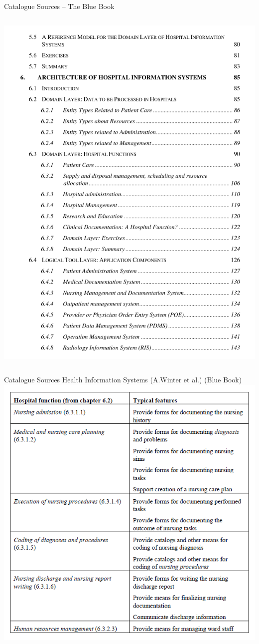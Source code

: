 \documentclass[aspectratio=1610,12pt]{beamer}
\newcommand{\enquote}[1]{{\glqq#1\grqq{}}}
\begin{document}
\begin{frame}{Catalogue Sources -- The \enquote{Blue Book}}
\begin{columns}
  \includegraphics[width=.9\textwidth,height=.8\textheight]{img/bb-content.png}
\end{columns}
\end{frame}

\begin{frame}{Catalogue Sources}
  \centering
  \large Health Information Systems (A.Winter et al.) (\enquote{Blue Book})
  \includegraphics[height=.7\textheight]{img/bb-table.png}
\end{frame}
\end{document}

